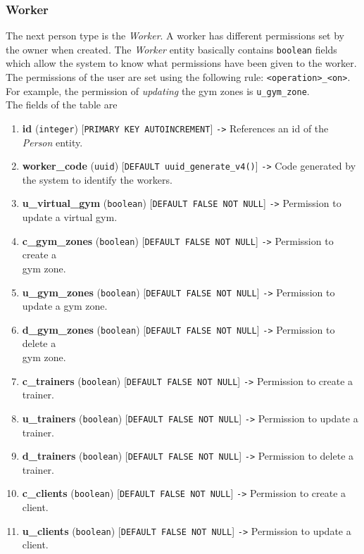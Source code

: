 \documentclass[a4paper, 12pt, oneside]{book}
\begin{document}
\subsubsection{Worker}
The next person type is the \emph{Worker}. A worker has different permissions set by the owner when created. The \emph{Worker} entity basically contains \texttt{boolean} fields which allow the system to know what permissions have been given to the worker. The permissions of the user are set using the following rule: \texttt{<operation>\_<on>}. For example, the permission of \emph{updating} the gym zones is \texttt{u\_gym\_zone}.
\\[8pt]
The fields of the table are
\begin{enumerate}[label = -]
	\item \textbf{id} (\texttt{integer}) [\texttt{PRIMARY KEY AUTOINCREMENT}] \texttt{->} References an id of the \emph{Person} entity.
	\item \textbf{worker\_code} (\texttt{uuid}) [\texttt{DEFAULT uuid\_generate\_v4()}] \texttt{->} Code generated by the system to identify the workers.
	\item \textbf{u\_virtual\_gym} (\texttt{boolean}) [\texttt{DEFAULT FALSE NOT NULL}] \texttt{->} Permission to update a virtual gym.
	\item \textbf{c\_gym\_zones} (\texttt{boolean}) [\texttt{DEFAULT FALSE NOT NULL}] \texttt{->} Permission to create a\\gym zone.
	\item \textbf{u\_gym\_zones} (\texttt{boolean}) [\texttt{DEFAULT FALSE NOT NULL}] \texttt{->} Permission to update a gym zone.
	\item \textbf{d\_gym\_zones} (\texttt{boolean}) [\texttt{DEFAULT FALSE NOT NULL}] \texttt{->} Permission to delete a\\gym zone.
	\item \textbf{c\_trainers} (\texttt{boolean}) [\texttt{DEFAULT FALSE NOT NULL}] \texttt{->} Permission to create a trainer.
	\item \textbf{u\_trainers} (\texttt{boolean}) [\texttt{DEFAULT FALSE NOT NULL}] \texttt{->} Permission to update a trainer.
	\item \textbf{d\_trainers} (\texttt{boolean}) [\texttt{DEFAULT FALSE NOT NULL}] \texttt{->} Permission to delete a trainer.
	\item \textbf{c\_clients} (\texttt{boolean}) [\texttt{DEFAULT FALSE NOT NULL}] \texttt{->} Permission to create a client.
	\item \textbf{u\_clients} (\texttt{boolean}) [\texttt{DEFAULT FALSE NOT NULL}] \texttt{->} Permission to update a client.

\end{enumerate}
\end{document}
